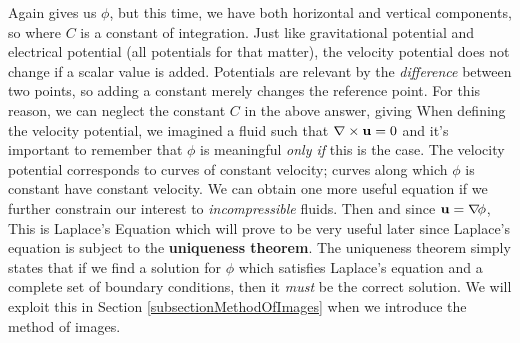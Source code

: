 \documentclass[12pt]{book}
\begin{document}
{
Again  gives us $\phi$, but this time, we have both horizontal and vertical components, so
where $C$ is a constant of integration. Just like gravitational potential and electrical potential (all potentials for that matter), the velocity potential does not change if a scalar value is added.  Potentials are relevant by the \textit{difference} between two points, so adding a constant merely changes the reference point.  For this reason, we can neglect the constant $C$ in the above answer, giving
}
When defining the velocity potential, we imagined a fluid such that $\curl\vec u = 0$ and it's important to remember that $\phi$ is meaningful \textit{only if} this is the case.  The velocity potential corresponds to curves of constant velocity; curves along which $\phi$ is constant have constant velocity. We can obtain one more useful equation if we further constrain our interest to \textit{incompressible} fluids. Then
and since $\vec u = \grad \phi$, 
This is Laplace's Equation
which will prove to be very useful later since Laplace's equation is subject to the \textbf{uniqueness theorem}.  The uniqueness theorem simply states that if we find a solution for $\phi$ which satisfies Laplace's equation and a complete set of boundary conditions, then it \textit{must} be the correct solution.  We will exploit this in Section \ref{subsectionMethodOfImages} when we introduce the method of images.
\end{document}
